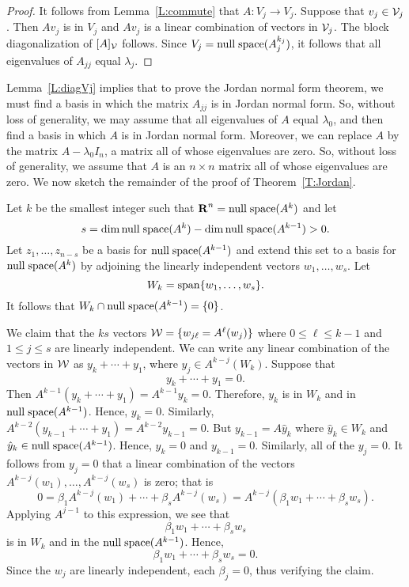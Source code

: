 \documentclass{ximera}
\begin{document}
\begin{proof}  It follows from Lemma~\ref{L:commute} that $A:V_j\to V_j$.  Suppose
that $v_j\in {\cal V}_j$.   Then $Av_j$ is in $V_j$ and $Av_j$ is a linear
combination of vectors in ${\cal V}_j$.   The block diagonalization of 
$[A]_{\cal V}$ follows.  Since $V_j={\rm null\;space}(A_j^{k_j})$, it follows that all
eigenvalues of $A_{jj}$ equal $\lambda_j$.   \end{proof}

Lemma~\ref{L:diagVj} implies that to prove the Jordan normal form theorem, 
we must find a basis in which the matrix $A_{jj}$ is in Jordan normal form.  
So, without loss of generality, we may assume that all eigenvalues of $A$ 
equal $\lambda_0$, and then find a basis in which $A$ is in Jordan normal 
form.  Moreover, we can replace $A$ by the matrix $A-\lambda_0I_n$, a
matrix all of whose eigenvalues are zero.  So, without loss of generality, we 
assume that $A$ is an $n\times n$ matrix all of whose eigenvalues are zero.  
We now sketch the remainder of the proof of Theorem~\ref{T:Jordan}.

Let $k$ be the smallest integer such that $\mbox{$\bf{R}$}^n = {\rm null\;space}(A^k)$ and let 
\[
s=\dim{\rm null\;space}(A^k)-\dim{\rm null\;space}(A^{k-1})>0.
\]
Let $z_1,\ldots,z_{n-s}$ be 
a basis for ${\rm null\;space}(A^{k-1})$ and extend this set to a basis for 
${\rm null\;space}(A^k)$ by adjoining the linearly independent vectors $w_1,\ldots,w_s$.  
Let 
\[
W_k={\rm span}\{w_1,\ldots,w_s\}.
\]
It follows that $W_k\cap{\rm null\;space}(A^{k-1})=\{0\}$.  

We claim that the $ks$ vectors ${\cal W}=\{w_{j\ell}=A^\ell(w_j)\}$ where 
$0\le\ell\le {k-1}$ and $1\le j\le s$ are linearly independent.  We can write 
any linear combination of the vectors in ${\cal W}$ as $y_k+\cdots+y_1$, 
where $y_j\in A^{k-j}(W_k)$.  Suppose that 
\[
y_k+\cdots+y_1=0.
\]
Then $A^{k-1}(y_k+\cdots+y_1)= A^{k-1}y_k=0$.  Therefore, $y_k$ is in $W_k$ 
and in ${\rm null\;space}(A^{k-1})$.  Hence, $y_k=0$.  Similarly, 
$A^{k-2}(y_{k-1}+\cdots+y_1)= A^{k-2}y_{k-1}=0$.  But $y_{k-1}=A\hat{y}_k$ 
where $\hat{y}_k\in W_k$ and $\hat{y}_k\in{\rm null\;space}(A^{k-1})$.  Hence, 
$\hat{y}_k=0$ and $y_{k-1}=0$.  Similarly, all of the $y_j=0$.  It follows 
from $y_j=0$ that a linear combination of the vectors 
$A^{k-j}(w_1),\ldots,A^{k-j}(w_s)$ is zero; that is
\[
0 = \beta_1A^{k-j}(w_1) + \cdots + \beta_sA^{k-j}(w_s) =
A^{k-j}(\beta_1w_1+\cdots+\beta_sw_s).
\]
Applying  $A^{j-1}$ to this expression, we see that 
\[
\beta_1w_1+\cdots+\beta_sw_s
\]
is in $W_k$ and in the ${\rm null\;space}(A^{k-1})$.  Hence, 
\[
\beta_1w_1+\cdots+\beta_sw_s = 0.
\]
Since the $w_j$ are linearly independent, each $\beta_j=0$, thus verifying 
the claim.
\end{document}
